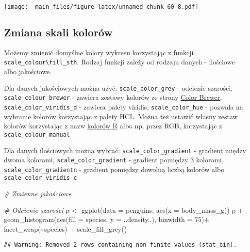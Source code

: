 \documentclass[
]{book}
\newenvironment{Shaded}{\begin{snugshade}}{\end{snugshade}}
\newcommand{\AttributeTok}[1]{\textcolor[rgb]{0.77,0.63,0.00}{#1}}
\newcommand{\CommentTok}[1]{\textcolor[rgb]{0.56,0.35,0.01}{\textit{#1}}}
\newcommand{\DecValTok}[1]{\textcolor[rgb]{0.00,0.00,0.81}{#1}}
\newcommand{\FunctionTok}[1]{\textcolor[rgb]{0.00,0.00,0.00}{#1}}
\newcommand{\NormalTok}[1]{#1}
\newcommand{\OtherTok}[1]{\textcolor[rgb]{0.56,0.35,0.01}{#1}}
\newcommand{\SpecialCharTok}[1]{\textcolor[rgb]{0.00,0.00,0.00}{#1}}
\begin{document}
\texttt{[image: \_main\_files/figure-latex/unnamed-chunk-60-8.pdf]}

\hypertarget{zmiana-skali-koloruxf3w}{%
\subsection{Zmiana skali kolorów}\label{zmiana-skali-koloruxf3w}}

Możemy zmienić domyślne kolory wykresu korzystając z funkcji \texttt{scale\_colour\textbackslash{}fill\_sth}. Rodzaj funkcji zależy od rodzaju danych - ilościowe albo jakościowe.

Dla danych jakościowych można użyć: \texttt{scale\_color\_grey} - odcienie szarości, \texttt{scale\_colour\_brewer} - zawiera zestawy kolorów ze strony \href{http://colorbrewer2.org/}{Color Brewer}, \texttt{scale\_color\_viridis\_d} - zawiera palety viridis, \texttt{scale\_color\_hue} - pozwala na wybranie kolorów korzystając z palety HCL. Można też ustawić własny zestaw kolorów korzystając z nazw \href{http://www.stat.columbia.edu/~tzheng/files/Rcolor.pdf}{kolorów R} albo np. przez RGB, korzystając z \texttt{scale\_colour\_manual}

Dla danych ilościowych można wybrać: \texttt{scale\_color\_gradient} - gradient między dwoma kolorami, \texttt{scale\_color\_gradient} - gradient pomiędzy 3 kolorami, \texttt{scale\_color\_gradientn} - gradient pomiędzy dowolną liczbą kolorów albo \texttt{scale\_color\_viridis\_c}

\begin{Shaded}
\begin{Highlighting}[]
\CommentTok{\# Zmienne jakościowe}

\CommentTok{\# Odcienie szarości}
\NormalTok{p }\OtherTok{\textless{}{-}} \FunctionTok{ggplot}\NormalTok{(}\AttributeTok{data =}\NormalTok{ penguins, }\FunctionTok{aes}\NormalTok{(}\AttributeTok{x =}\NormalTok{ body\_mass\_g))}
\NormalTok{p }\SpecialCharTok{+} \FunctionTok{geom\_histogram}\NormalTok{(}\FunctionTok{aes}\NormalTok{(}\AttributeTok{fill =}\NormalTok{ species, }\AttributeTok{y =}\NormalTok{ ..density..), }\AttributeTok{binwidth =} \DecValTok{75}\NormalTok{)}\SpecialCharTok{+}
  \FunctionTok{facet\_wrap}\NormalTok{(}\SpecialCharTok{\textasciitilde{}}\NormalTok{species) }\SpecialCharTok{+} \FunctionTok{scale\_fill\_grey}\NormalTok{()}
\end{Highlighting}
\end{Shaded}

\begin{verbatim}
## Warning: Removed 2 rows containing non-finite values (stat_bin).
\end{verbatim}
\end{document}
